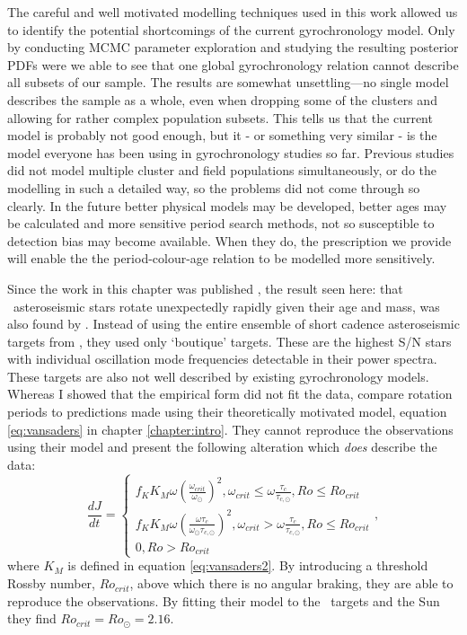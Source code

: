 The careful and well motivated modelling techniques used in this work
allowed us to identify the potential shortcomings of the current
gyrochronology model.
Only by conducting MCMC parameter exploration and studying the resulting
posterior PDFs were we able to see that one global gyrochronology relation
cannot describe all subsets of our sample.
The results are somewhat unsettling---no single model describes the sample as
a whole, even when dropping some of the clusters and allowing for rather
complex population subsets.
This tells us that the current model is probably not good enough, but it - or
something very similar - is the model everyone has been using in
gyrochronology studies so far.
Previous studies did not model multiple cluster and field populations
simultaneously, or do the modelling in such a detailed way, so the problems
did not come through so clearly.
In the future better physical models may be developed, better ages may be
calculated and more sensitive period search methods, not so susceptible to
detection bias may become available.
When they do, the prescription we provide will enable the the
period-colour-age relation to be modelled more sensitively.

Since the work in this chapter was published \citep{Angus2015}, the
result seen here: that \kepler\ asteroseismic stars rotate unexpectedly
rapidly given their age and mass, was also found by \citet{Vansaders2016}.
Instead of using the entire ensemble of short cadence asteroseismic targets
from \citet{Chaplin2014}, they used only `boutique' targets.
These are the highest S/N stars with individual oscillation mode frequencies
detectable in their power spectra.
These targets are also not well described by existing gyrochronology
models.
Whereas I showed that the \citet{Barnes2007} empirical form did not
fit the data, \citet{Vansaders2016} compare rotation periods to predictions
made using their theoretically motivated model, equation \ref{eq:vansaders} in
chapter \ref{chapter:intro}.
They cannot reproduce the observations using their model and present the
following alteration which {\it does} describe the data:
\begin{equation}
\frac{dJ}{dt} = \left\{
                \begin{array}{ll}
                  f_K K_M \omega \left( \frac{\omega_{crit}}{\omega_\odot}
                  \right)^2, \omega_{crit} \leq \omega
                  \frac{\tau_{c}}{\tau_{c, \odot}}, Ro \leq Ro_{crit} \\
                  f_K K_M \omega \left( \frac{\omega\tau_{c}}
                  {\omega_\odot\tau_{c, \odot}}
                  \right)^2, \omega_{crit} > \omega
                  \frac{\tau_{c}}{\tau_{c, \odot}}, Ro \leq Ro_{crit} \\
                  0, Ro > Ro_{crit}
                \end{array}
              \right.,
\end{equation}
where $K_M$ is defined in equation \ref{eq:vansaders2}.
By introducing a threshold Rossby number, $Ro_{crit}$, above which there is
no angular braking, they are able to reproduce the observations.
By fitting their model to the \kepler\ targets and the Sun they find
$Ro_{crit} = Ro_\odot = 2.16$.

